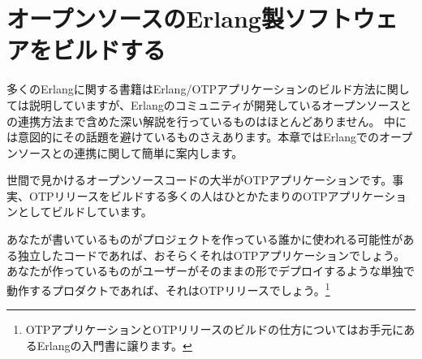 \chapter{オープンソースのErlang製ソフトウェアをビルドする}
\label{chap:building-open-source-erlang-software}

多くのErlangに関する書籍はErlang/OTPアプリケーションのビルド方法に関しては説明していますが、Erlangのコミュニティが開発しているオープンソースとの連携方法まで含めた深い解説を行っているものはほとんどありません。
中には意図的にその話題を避けているものさえあります。本章ではErlangでのオープンソースとの連携に関して簡単に案内します。

世間で見かけるオープンソースコードの大半がOTPアプリケーションです。事実、OTPリリースをビルドする多くの人はひとかたまりのOTPアプリケーションとしてビルドしています。

あなたが書いているものがプロジェクトを作っている誰かに使われる可能性がある独立したコードであれば、おそらくそれはOTPアプリケーションでしょう。
あなたが作っているものがユーザーがそのままの形でデプロイするような単独で動作するプロダクトであれば、それはOTPリリースでしょう。\footnote{OTPアプリケーションとOTPリリースのビルドの仕方についてはお手元にあるErlangの入門書に譲ります。}

